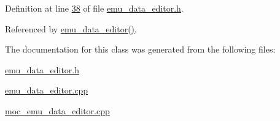 Definition at line \hyperlink{a00036_source_l00038}{38} of file \hyperlink{a00036_source}{emu\+\_\+data\+\_\+editor.\+h}.



Referenced by \hyperlink{a00035_source_l00012}{emu\+\_\+data\+\_\+editor()}.



The documentation for this class was generated from the following files\+:\begin{DoxyCompactItemize}
\item 
\hyperlink{a00036}{emu\+\_\+data\+\_\+editor.\+h}\item 
\hyperlink{a00035}{emu\+\_\+data\+\_\+editor.\+cpp}\item 
\hyperlink{a00014}{moc\+\_\+emu\+\_\+data\+\_\+editor.\+cpp}\end{DoxyCompactItemize}
